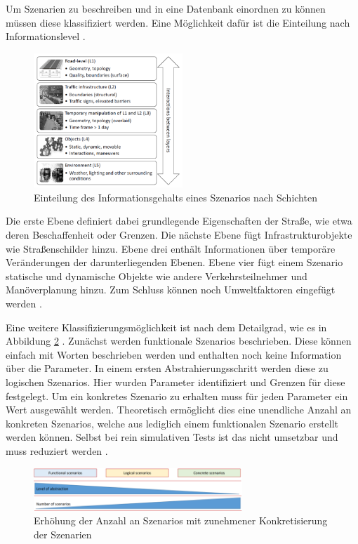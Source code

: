 Um Szenarien zu beschreiben und in eine Datenbank einordnen zu können müssen diese klassifiziert werden. Eine Möglichkeit dafür ist die Einteilung nach Informationslevel \cite{Nalic2020}\cite{Bagschik2018}.
\begin{figure}[H]
    \centering
    \includegraphics[width=0.5\textwidth]{figures/2_Grundlagen/layer_model.png}
    \caption{Einteilung des Informationsgehalts eines Szenarios nach Schichten \cite{Bagschik2018}}
    \label{fig:layer_model}
\end{figure}
Die erste Ebene definiert dabei grundlegende Eigenschaften der Straße, wie etwa deren Beschaffenheit oder Grenzen. Die nächste Ebene fügt Infrastrukturobjekte wie Straßenschilder hinzu. Ebene drei enthält Informationen über temporäre Veränderungen der darunterliegenden Ebenen. Ebene vier fügt einem Szenario statische und dynamische Objekte wie andere Verkehrsteilnehmer und Manöverplanung hinzu. Zum Schluss können noch Umweltfaktoren eingefügt werden \cite{Bagschik2018}.

Eine weitere Klassifizierungsmöglichkeit ist nach dem Detailgrad, wie es in Abbildung \ref{fig:scenario_level} \cite{Nalic2020}\cite{menzel2018scenarios}. Zunächst werden funktionale Szenarios beschrieben. Diese können einfach mit Worten beschrieben werden und enthalten noch keine Information über die Parameter. In einem ersten Abstrahierungsschritt werden diese zu logischen Szenarios. Hier wurden Parameter identifiziert und Grenzen für diese festgelegt. Um ein konkretes Szenario zu erhalten muss für jeden Parameter ein Wert ausgewählt werden. Theoretisch ermöglicht dies eine unendliche Anzahl an konkreten Szenarios, welche aus lediglich einem funktionalen Szenario erstellt werden können. Selbst bei rein simulativen Tests ist das nicht umsetzbar und muss reduziert werden \cite{menzel2018scenarios}.
\begin{figure}
    \centering
    \includegraphics[width=0.7\textwidth]{figures/2_Grundlagen/scenario_level.png}
    \caption{Erhöhung der Anzahl an Szenarios mit zunehmener Konkretisierung der Szenarien \cite{menzel2018scenarios}}
    \label{fig:scenario_level}
\end{figure}

